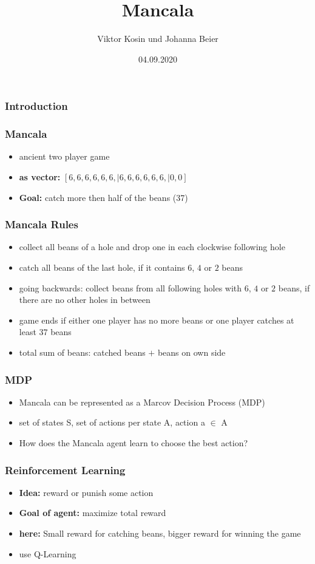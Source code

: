 \documentclass{beamer}
\title{Mancala}
\author{Viktor Kosin und Johanna Beier}
\date{04.09.2020}
\begin{document}
\frame{\titlepage}

\begin{frame}
\frametitle{Introduction}

\end{frame}

\begin{frame}
\frametitle{Mancala}
\begin{itemize}
\item ancient two player game
\end{itemize}
\begin{itemize}
\item \textbf{as vector:} $[6,6,6,6,6,6, | 6,6,6,6,6,6, |0,0]$
\item\textbf{Goal:} catch more then half of the beans (37) 
\end{itemize}
\end{frame}

\begin{frame}
\frametitle{Mancala Rules}
\begin{itemize}
\item collect all beans of a hole and drop one in each clockwise following hole
\item catch all beans of the last hole, if it contains $6$, $4$ or $2$ beans
\item going backwards: collect beans from all following holes with $6$, $4$ or $2$ beans, if there are no other holes in between
\item game ends if either one player has no more beans or one player catches at least $37$ beans
\item total sum of beans: catched beans $+$ beans on own side
\end{itemize}
\end{frame}

\begin{frame}
 \frametitle{MDP}
 \begin{itemize}
 \item Mancala can be represented as a Marcov Decision Process (MDP)
 \item set of states S, set of actions per state A, action a $\in$ A
 \item How does the Mancala agent learn to choose the best action?
 \end{itemize}
 \end{frame}

 \begin{frame}
 \frametitle{Reinforcement Learning}
 \begin{itemize}
 \item \textbf{Idea:} reward or punish some action
 \item \textbf{Goal of agent:} maximize total reward
 \item \textbf{here:} Small reward for catching beans, bigger reward for winning the game
 \item use Q-Learning
 \end{itemize}
 \end{frame}
 
\end{document}
